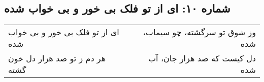 \begin{center}
\section*{شماره ۱۰: ای از تو فلک بی خور و بی خواب شده}
\label{sec:010}
\begin{longtable}{l p{0.5cm} r}
ای از تو فلک بی خور و بی خواب شده
&&
وز شوق تو سرگشته، چو سیماب، شده
\\
هر دم ز تو صد هزار دل خون گشته
&&
دل کیست که صد هزار جان، آب شده
\\
\end{longtable}
\end{center}
